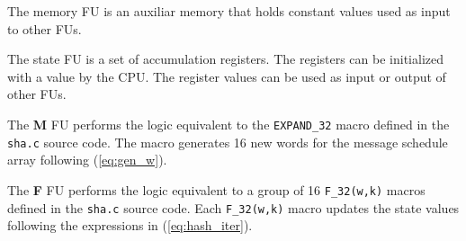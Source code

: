 The memory FU is an auxiliar memory that holds constant values used as input to
other FUs.

The state FU is a set of accumulation registers. The registers can be
initialized with a value by the CPU. The register values can be used as input or
output of other FUs.

The \textbf{M} FU performs the logic equivalent to the \texttt{EXPAND\_32}
macro defined in the \texttt{sha.c} source code. The macro generates 16 new
words for the message schedule array following (\ref{eq:gen_w}).

The \textbf{F} FU performs the logic equivalent to a group of 16
\texttt{F\_32(w,k)} macros defined in the \texttt{sha.c} source code.
Each \texttt{F\_32(w,k)} macro updates the state values following the
expressions in (\ref{eq:hash_iter}).
